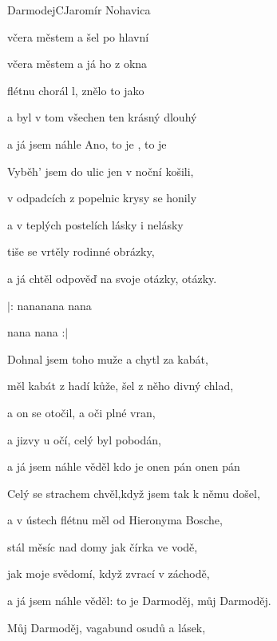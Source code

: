 \begin{song}{Darmodej}{C}{Jaromír Nohavica}
  \begin{SBVerse}
 včera městem  a šel po hlavní  

 včera městem  a já ho z okna 

 flétnu chorál l, znělo to jako 

a byl v tom všechen  ten krásný dlouhý 

a já jsem náhle  Ano, to je , to je 
  \end{SBVerse}
  \begin{SBVerse}
Vyběh' jsem do ulic jen v noční košili, 

v odpadcích z popelnic krysy se honily

a v teplých postelích lásky i nelásky 

tiše se vrtěly rodinné obrázky,

a já chtěl odpověď na svoje otázky, otázky.
  \end{SBVerse}
\begin{SBChorus}
$|$: nananana nana 

nana nana  :$|$
\end{SBChorus}
\begin{SBVerse}
Dohnal jsem toho muže a chytl za kabát,

měl kabát z hadí kůže, šel z něho divný chlad,

a on se otočil, a oči plné vran,

a jizvy u očí, celý byl pobodán,

a já jsem náhle věděl kdo je onen pán onen pán

  \end{SBVerse}
\begin{SBVerse}

Celý se strachem chvěl,když jsem tak k němu došel,

a v ústech flétnu měl od Hieronyma Bosche,

stál měsíc nad domy jak čírka ve vodě,

jak moje svědomí, když zvrací v záchodě,

a já jsem náhle věděl: to je Darmoděj, můj Darmoděj.

  \end{SBVerse}
\begin{SBChorus}
Můj Darmoděj, vagabund osudů a lásek,


\end{SBChorus}
\end{song}
